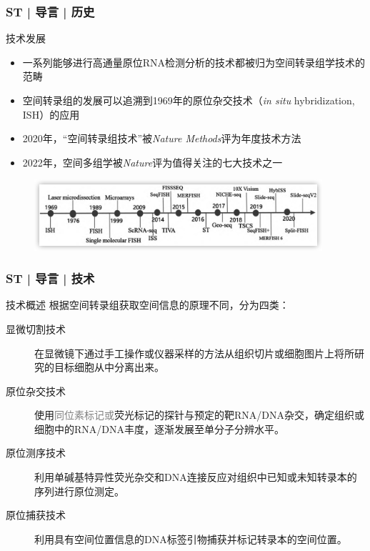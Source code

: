 \documentclass[11pt]{ctexbeamer}
\begin{document}
\begin{frame}
	\frametitle{ST | 导言 | 历史}
	\begin{block}{技术发展}
		\begin{itemize}
			\item 一系列能够进行高通量原位RNA检测分析的技术都被归为空间转录组学技术的范畴
			\item 空间转录组的发展可以追溯到1969年的原位杂交技术（\textit{in situ} hybridization, ISH）的应用
			\item 2020年，“空间转录组技术”被\textit{Nature Methods}评为年度技术方法
			\item 2022年，空间多组学被\textit{Nature}评为值得关注的七大技术之一
		\end{itemize}
	\end{block}
\vspace{-0.5em}
	\begin{figure}
	\includegraphics[width=0.95\textwidth]{ST_history_03.png}
\end{figure}
\end{frame}

\begin{frame}
	\frametitle{ST | 导言 | 技术}
	\begin{block}{技术概述}
		根据空间转录组获取空间信息的原理不同，分为四类：
		\begin{description}
			\item[显微切割技术] 在显微镜下通过手工操作或仪器采样的方法从组织切片或细胞图片上将所研究的目标细胞从中分离出来。
			\item[原位杂交技术] 使用\textcolor{gray}{同位素标记或}荧光标记的探针与预定的靶RNA/DNA杂交，确定组织或细胞中的RNA/DNA丰度，逐渐发展至单分子分辨水平。
			\item[原位测序技术] 利用单碱基特异性荧光杂交和DNA连接反应对组织中已知或未知转录本的序列进行原位测定。
			\item[\alert{原位捕获技术}] 利用具有空间位置信息的DNA标签引物捕获并标记转录本的空间位置。
		\end{description}
	\end{block}
\end{frame}
\end{document}
